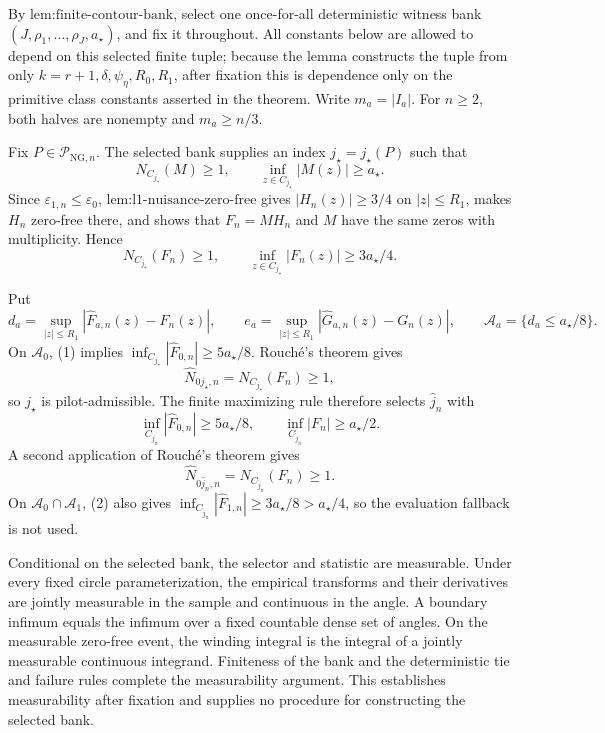 By \(\text{lem:finite-contour-bank}\), select one once-for-all deterministic witness bank \((J,\rho_1,\ldots,\rho_J,a_{\star})\), and fix it throughout.  All constants below are allowed to depend on this selected finite tuple; because the lemma constructs the tuple from only \(k=r+1,\delta,\psi_{\eta},R_0,R_1\), after fixation this is dependence only on the primitive class constants asserted in the theorem.  Write \(m_a=|I_a|\).  For \(n\ge2\), both halves are nonempty and \(m_a\ge n/3\).

Fix \(P\in\mathcal P_{\mathrm{NG},n}\).  The selected bank supplies an index \(j_{\star}=j_{\star}(P)\) such that
\[
 N_{C_{j_{\star}}}(M)\ge1,
 \qquad \inf_{z\in C_{j_{\star}}}|M(z)|\ge a_{\star}.
\]
Since \(\varepsilon_{1,n}\le\varepsilon_0\), \(\text{lem:l1-nuisance-zero-free}\) gives \(|H_n(z)|\ge3/4\) on \(|z|\le R_1\), makes \(H_n\) zero-free there, and shows that \(F_n=MH_n\) and \(M\) have the same zeros with multiplicity.  Hence
\[
 N_{C_{j_{\star}}}(F_n)\ge1,
 \qquad \inf_{z\in C_{j_{\star}}}|F_n(z)|\ge3a_{\star}/4. \tag{1}
\]

Put
\[
 d_a=\sup_{|z|\le R_1}|\widehat F_{a,n}(z)-F_n(z)|,
 \qquad
 e_a=\sup_{|z|\le R_1}|\widehat G_{a,n}(z)-G_n(z)|,
 \qquad
 \mathcal A_a=\{d_a\le a_{\star}/8\}.
\]
On \(\mathcal A_0\), (1) implies \(\inf_{C_{j_{\star}}}|\widehat F_{0,n}|\ge5a_{\star}/8\).  Rouch\'e's theorem gives
\[
 \widehat N_{0j_{\star},n}=N_{C_{j_{\star}}}(F_n)\ge1,
\]
so \(j_{\star}\) is pilot-admissible.  The finite maximizing rule therefore selects \(\widehat j_n\) with
\[
 \inf_{C_{\widehat j_n}}|\widehat F_{0,n}|\ge5a_{\star}/8,
 \qquad
 \inf_{C_{\widehat j_n}}|F_n|\ge a_{\star}/2. \tag{2}
\]
A second application of Rouch\'e's theorem gives
\[
 \widehat N_{0\widehat j_n,n}=N_{C_{\widehat j_n}}(F_n)\ge1. \tag{3}
\]
On \(\mathcal A_0\cap\mathcal A_1\), (2) also gives \(\inf_{C_{\widehat j_n}}|\widehat F_{1,n}|\ge3a_{\star}/8>a_{\star}/4\), so the evaluation fallback is not used.

Conditional on the selected bank, the selector and statistic are measurable.  Under every fixed circle parameterization, the empirical transforms and their derivatives are jointly measurable in the sample and continuous in the angle.  A boundary infimum equals the infimum over a fixed countable dense set of angles.  On the measurable zero-free event, the winding integral is the integral of a jointly measurable continuous integrand.  Finiteness of the bank and the deterministic tie and failure rules complete the measurability argument.  This establishes measurability after fixation and supplies no procedure for constructing the selected bank.

